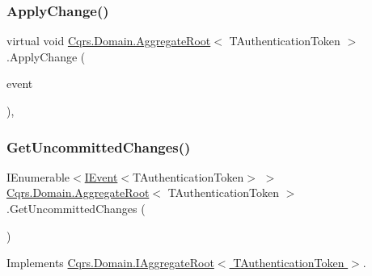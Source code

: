 \subsubsection{\texorpdfstring{Apply\+Change()}{ApplyChange()}}
{\footnotesize\ttfamily virtual void \hyperlink{classCqrs_1_1Domain_1_1AggregateRoot}{Cqrs.\+Domain.\+Aggregate\+Root}$<$ T\+Authentication\+Token $>$.Apply\+Change (\begin{DoxyParamCaption}\item[{\hyperlink{interfaceCqrs_1_1Events_1_1IEvent}{I\+Event}$<$ T\+Authentication\+Token $>$ @}]{event }\end{DoxyParamCaption})\hspace{0.3cm}{\ttfamily [protected]}, {\ttfamily [virtual]}}

\mbox{\label{classCqrs_1_1Domain_1_1AggregateRoot_a625e885ec7885a686f729ed1efe3a8fa}} 
\subsubsection{\texorpdfstring{Get\+Uncommitted\+Changes()}{GetUncommittedChanges()}}
{\footnotesize\ttfamily I\+Enumerable$<$\hyperlink{interfaceCqrs_1_1Events_1_1IEvent}{I\+Event}$<$T\+Authentication\+Token$>$ $>$ \hyperlink{classCqrs_1_1Domain_1_1AggregateRoot}{Cqrs.\+Domain.\+Aggregate\+Root}$<$ T\+Authentication\+Token $>$.Get\+Uncommitted\+Changes (\begin{DoxyParamCaption}{ }\end{DoxyParamCaption})}



Implements \hyperlink{interfaceCqrs_1_1Domain_1_1IAggregateRoot_a22fda414613f5ac0d4371554d7d6473b}{Cqrs.\+Domain.\+I\+Aggregate\+Root$<$ T\+Authentication\+Token $>$}.

\mbox{\label{classCqrs_1_1Domain_1_1AggregateRoot_aec873ad6e4c98309cad2d9f1c534aebb}} 
